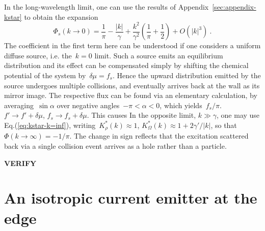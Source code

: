 \documentclass[preprint,aps,eqsecnum, prb]{revtex4-1}
\begin{document}
In the long-wavelength limit, one can  use  the results of
Appendix~\ref{sec:appendix-kstar} to obtain the expansion
\begin{equation}
  \label{eq:phi-s-low}
  \Phi_s(k\to 0) = \frac{1}{\pi} - \frac{|k|}{\gamma} + \frac{k^2}{\gamma^2}
  \left(\frac{1}{\pi} + \frac{1}{2}\right)
  + O(|k|^3)
  \ .
\end{equation}
The coefficient in the first term here can be understood if one
considers a uniform diffuse source, i.e. the~$k = 0$ limit.
Such a source emits an equilibrium distribution and its effect
can be compensated simply by shifting the chemical potential
of the system by~$\delta\mu = f_s$. Hence the upward distribution
emitted by the source undergoes multiple collisions,
and eventually arrives back at the wall as its mirror image.
The respective flux can be found via an elementary calculation,
by averaging~$\sin\alpha$ over negative angles~$-\pi < \alpha < 0$,
which yields~$f_s/\pi$.
$f' \to f' + \delta\mu$, $f_s \to f_s +  \delta\mu$. This causes
In the opposite limit, $k \gg \gamma$, one
may use Eq.(\ref{eq:kstar-k=inf}), writing~$K^\ast_\rho(k) \approx 1$,
$K_\Omega^\ast(k) \approx 1 + 2\gamma'/|k|$,
so that~$\Phi(k \to\infty) = - 1/\pi$.
The change in sign reflects that the excitation scattered back via a single
collision event arrives as a hole rather than a particle.

\textbf{VERIFY}

\section{An isotropic current emitter at the edge}
\label{sec:boundary-src}
\end{document}
